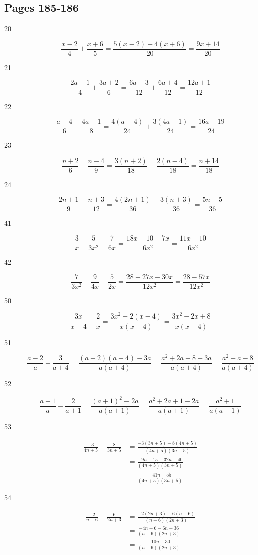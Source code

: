 \documentclass[fleqn,addpoints]{exam}
\begin{document}
\subsection{Pages 185-186}

\begin{description}
\item[20]
\[ \frac{x - 2}{4} + \frac{x + 6}{5} = \frac{5(x - 2) + 4(x + 6)}{20} = \frac{9x + 14}{20} \]

\item[21]
\[ \frac{2a - 1}{4} + \frac{3a + 2}{6} = \frac{6a - 3}{12} + \frac{6a + 4}{12} = \frac{12a + 1}{12} \]

\item[22]
\[ \frac{a - 4}{6} + \frac{4a - 1}{8} = \frac{4(a - 4)}{24} + \frac{3(4a - 1)}{24} = \frac{16a - 19}{24} \]

\item[23]
\[ \frac{n+2}{6} - \frac{n-4}{9} = \frac{3(n+2)}{18} - \frac{2(n-4)}{18} = \frac{n + 14}{18}\]

\item[24]
\[ \frac{2n+1}{9} - \frac{n+3}{12} = \frac{4(2n+1)}{36} - \frac{3(n+3)}{36} = \frac{5n-5}{36}\]

\item[41]
\[ \frac{3}{x} - \frac{5}{3x^2} - \frac{7}{6x} = \frac{18x - 10 -7x}{6x^2} = \frac{11x - 10}{6x^2} \]

\item[42]
\[ \frac{7}{3x^2} - \frac{9}{4x} - \frac{5}{2x} = \frac{28 - 27x - 30x}{12x^2} = \frac{28 - 57x}{12x^2} \]

\item[50]
\[ \frac{3x}{x-4} - \frac{2}{x} = \frac{3x^2 - 2(x-4)}{x(x-4)} = \frac{3x^2 - 2x + 8}{x(x-4)} \]

\item[51]
\[ \frac{a-2}{a} - \frac{3}{a+4} = \frac{(a-2)(a+4) - 3a}{a(a+4)} = \frac{a^2 + 2a - 8 - 3a}{a(a+4)} 
= \frac{a^2 - a - 8}{a(a+4)} \]

\item[52]
\[ \frac{a+1}{a} - \frac{2}{a+1} = \frac{(a+1)^2 - 2a}{a(a+1)} = \frac{a^2 + 2a + 1 - 2a}{a(a+1)} 
= \frac{a^2 + 1}{a(a+1)} \]

\item[53]
\begin{align*}
  \frac{-3}{4n+5} - \frac{8}{3n+5} &= \frac{-3(3n+5) - 8(4n+5)}{(4n+5)(3n+5)} \\
  &= \frac{-9n - 15 - 32n - 40}{(4n + 5)(3n+5)} \\
  &= \frac{-41n - 55}{(4n + 5)(3n + 5)}
\end{align*}

\item[54]
\begin{align*}
  \frac{-2}{n-6} - \frac{6}{2n+3} &= \frac{-2(2n+3) - 6(n-6)}{(n-6)(2n+3)} \\
  &= \frac{-4n - 6 - 6n + 36}{(n-6)(2n+3)} \\
  &= \frac{-10n + 30}{(n-6)(2n+3)}
\end{align*}

\end{description}
\fi
\end{document}
